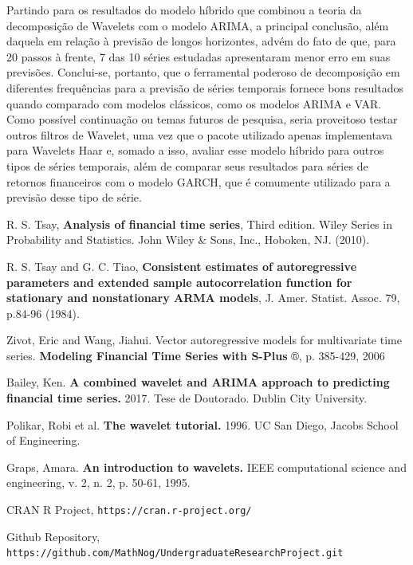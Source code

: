 \documentclass[12pt]{article}
\begin{document}
	Partindo para os resultados do modelo híbrido que combinou a teoria da decomposição de \textrm{Wavelets} com o modelo ARIMA, a principal conclusão, além daquela em relação à previsão de longos horizontes, advém do fato de que, para 20 passos à frente, 7 das 10 séries estudadas apresentaram menor erro em suas previsões. Conclui-se, portanto, que o ferramental poderoso de decomposição em diferentes frequências para a previsão de séries temporais fornece bons resultados quando comparado com modelos clássicos, como os modelos ARIMA e VAR. Como possível continuação ou temas futuros de pesquisa, seria proveitoso testar outros filtros de \textrm{Wavelet}, uma vez que o pacote utilizado apenas implementava para \textrm{Wavelets Haar} e, somado a isso, avaliar esse modelo híbrido para outros tipos de séries temporais, além de comparar seus resultados para séries de retornos financeiros com o modelo GARCH, que é comumente utilizado para a previsão desse tipo de série.
	
	
	
	
	\begin{thebibliography}{99} 
		
		 R. S. Tsay,
		{\bf Analysis of financial time series},
		Third edition. Wiley Series in Probability and Statistics.  John Wiley \& Sons, Inc., Hoboken, NJ.  (2010).
		
		 R. S. Tsay and G. C. Tiao,
		{\bf Consistent estimates of autoregressive parameters and extended sample autocorrelation function for stationary and nonstationary ARMA models},
		J. Amer. Statist. Assoc. 79, p.84-96 (1984).
		
		 Zivot, Eric and Wang, Jiahui. Vector autoregressive models for multivariate time series. \textbf{Modeling Financial Time Series with S-Plus} ®, p. 385-429, 2006
		
		 Bailey, Ken. \textbf{A combined wavelet and ARIMA approach to predicting financial time series.} 2017. Tese de Doutorado. Dublin City University.
		
		Polikar, Robi et al. \textbf{The wavelet tutorial.} 1996. UC San Diego, Jacobs School of Engineering.
		
		Graps, Amara. \textbf{An introduction to wavelets.} IEEE computational science and engineering, v. 2, n. 2, p. 50-61, 1995.
		
		CRAN R Project, \texttt{https://cran.r-project.org/}
		
		Github Repository, \texttt{https://github.com/MathNog/UndergraduateResearchProject.git}
		
		
		
	\end{thebibliography}
\end{document}
